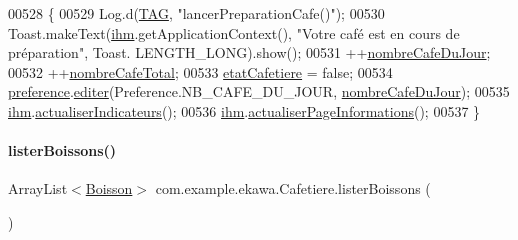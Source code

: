 \begin{DoxyCode}
00528     \{
00529         Log.d(\hyperlink{classcom_1_1example_1_1ekawa_1_1_cafetiere_aa0c1fd99a2508b06c462aea17034aa91}{TAG}, \textcolor{stringliteral}{"lancerPreparationCafe()"});
00530         Toast.makeText(\hyperlink{classcom_1_1example_1_1ekawa_1_1_cafetiere_a7db4a63088834eda5f6a3e951611bf82}{ihm}.getApplicationContext(), \textcolor{stringliteral}{"Votre café est en cours de préparation"}, Toast.
      LENGTH\_LONG).show();
00531         ++\hyperlink{classcom_1_1example_1_1ekawa_1_1_cafetiere_a123b6fcb9a9c1decae40e026660e716b}{nombreCafeDuJour};
00532         ++\hyperlink{classcom_1_1example_1_1ekawa_1_1_cafetiere_ac22f9da8ed59c7362871b8f22e501e23}{nombreCafeTotal};
00533         \hyperlink{classcom_1_1example_1_1ekawa_1_1_cafetiere_ae170dd018d1e740b3bda080d1cc3d900}{etatCafetiere} = \textcolor{keyword}{false};
00534         \hyperlink{classcom_1_1example_1_1ekawa_1_1_cafetiere_aee3f9b78df63bc8dd73bf564954d51ca}{preference}.\hyperlink{classcom_1_1example_1_1ekawa_1_1_preference_a5af7a0595acfd41f1bd0b34ca0bfcb2a}{editer}(Preference.NB\_CAFE\_DU\_JOUR, 
      \hyperlink{classcom_1_1example_1_1ekawa_1_1_cafetiere_a123b6fcb9a9c1decae40e026660e716b}{nombreCafeDuJour});
00535         \hyperlink{classcom_1_1example_1_1ekawa_1_1_cafetiere_a7db4a63088834eda5f6a3e951611bf82}{ihm}.\hyperlink{classcom_1_1example_1_1ekawa_1_1_ihm_a2c3740dd5be20b3111b36649514fd41e}{actualiserIndicateurs}();
00536         \hyperlink{classcom_1_1example_1_1ekawa_1_1_cafetiere_a7db4a63088834eda5f6a3e951611bf82}{ihm}.\hyperlink{classcom_1_1example_1_1ekawa_1_1_ihm_a2422719a8e893b23e95f80b5899adb76}{actualiserPageInformations}();
00537     \}
\end{DoxyCode}
\mbox{\label{classcom_1_1example_1_1ekawa_1_1_cafetiere_a508a256d85a4e78c2b5c1a45899fcd99}} 
\paragraph{\texorpdfstring{lister\+Boissons()}{listerBoissons()}}
{\footnotesize\ttfamily Array\+List$<$\hyperlink{classcom_1_1example_1_1ekawa_1_1_boisson}{Boisson}$>$ com.\+example.\+ekawa.\+Cafetiere.\+lister\+Boissons (\begin{DoxyParamCaption}{ }\end{DoxyParamCaption})}



